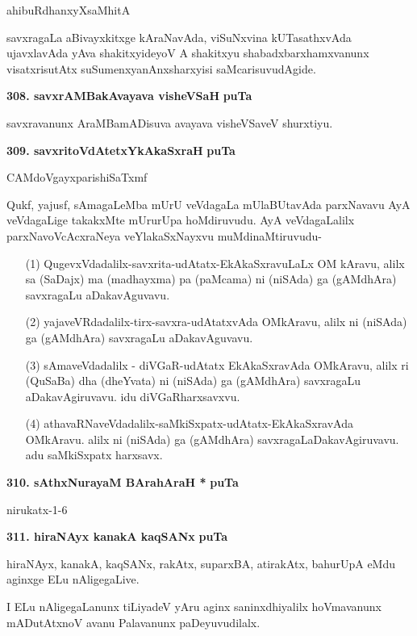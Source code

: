 {\hfill ahibuRdhanxyXsaMhitA

\smallskip
savxragaLa aBivayxkitxge kAraNavAda, viSuNxvina kUTasathxvAda ujavxlavAda yAva shakitxyideyoV A shakitx\-yu shabadxbarxhamxvanunx visatxrisutAtx suSumenxyanAnxsharxyisi saMcarisuvudAgide.

\medskip
\noindent
\textbf{308. savxrAMBakAvayava visheVSaH} \hfill {\bf puTa \pageref{172}}

\smallskip
savxravanunx AraMBamADisuva avayava visheVSaveV shurxtiyu.

\medskip
\noindent
\textbf{309. savxritoVdAtetxYkAkaSxraH} \hfill {\bf puTa \pageref{156}}

\hfill CAMdoVgayxparishiSaTxmf

\smallskip
Qukf, yajusf, sAmagaLeMba mUrU veVdagaLa mUlaBUtavAda parxNavavu AyA veVda\-gaLige takakxMte mUrurUpa hoMdiruvudu. AyA veVdagaLalilx parxNavoVcAcxraNeya veYlakaSxNayxvu muMdi\-naMtiruvudu-

\begin{itemize}
\item[(1)] QugevxVdadalilx-savxrita-udAtatx-EkAkaSxravuLaLx OM kAravu, alilx sa (SaDajx) ma (madhayxma) pa (paMcama) ni (niSAda) ga (gAMdhAra) savxragaLu aDakavAguvavu.

\item[(2)] yajaveVRdadalilx-tirx-savxra-udAtatxvAda OMkAravu, alilx ni (niSAda) ga (gAMdhAra) savxragaLu aDaka\-vAguvavu.

\item[(3)] sAmaveVdadalilx - diVGaR-udAtatx EkAkaSxravAda OMkAravu, alilx ri (QuSaBa) dha (dheYvata) ni (niSAda) ga (gAMdhAra) savxragaLu aDakavAgiruvavu. idu diVGaRharxsavxvu.

\item[(4)] athavaRNaveVdadalilx-saMkiSxpatx-udAtatx-EkAkaSxravAda OMkAravu. alilx ni (niSAda) ga (gAMdhAra) savxragaLaDakavAgiruvavu. adu saMkiSxpatx harxsavx. 

\end{itemize}

\noindent
\textbf{310. sAthxNurayaM BArahAraH *} \hfill {\bf puTa \pageref{39}}

\hfill nirukatx-1-6

\medskip
\noindent
\textbf{311. hiraNAyx kanakA kaqSANx} \hfill {\bf puTa \pageref{116}}

\smallskip
hiraNAyx, kanakA, kaqSANx, rakAtx, suparxBA, atirakAtx, bahurUpA eMdu aginxge ELu nAligegaLive.

I ELu nAligegaLanunx tiLiyadeV yAru aginx saninxdhiyalilx hoVmavanunx mADutAtxnoV avanu Palavanunx paDeyuvudilalx.

}
